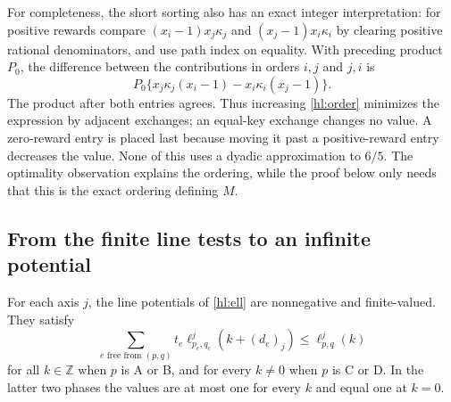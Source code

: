 For completeness, the short sorting also has an exact integer
interpretation: for positive rewards compare
$(x_i-1)x_j\kappa_j$ and $(x_j-1)x_i\kappa_i$ by clearing
positive rational denominators, and use path index on equality.
With preceding product $P_0$, the difference between the
contributions in orders $i,j$ and $j,i$ is
\begin{equation}\label{hl:exchange}
 P_0\{x_j\kappa_j(x_i-1)-x_i\kappa_i(x_j-1)\}.
\end{equation}
The product after both entries agrees.  Thus increasing
\eqref{hl:order} minimizes the expression by adjacent exchanges;
an equal-key exchange changes no value.  A zero-reward entry is
placed last because moving it past a positive-reward entry decreases
the value.  None of this uses a dyadic approximation to $6/5$.
The optimality observation explains the ordering, while the proof
below only needs that this is the exact ordering defining $M$.

\subsection{From the finite line tests to an infinite potential}

\begin{lemma}\label{hl:taillemma}
For each axis $j$, the line potentials of \eqref{hl:ell} are
nonnegative and finite-valued.  They satisfy
\begin{equation}\label{hl:lineexact}
 \sum_{e\text{ free from }(p,q)}t_e
             \ell^j_{p_e,q_e}(k+(d_e)_j)\le\ell^j_{p,q}(k)
\end{equation}
for all $k\in\mathbb Z$ when $p$ is A or B, and for every
$k\ne0$ when $p$ is C or D.  In the latter two phases the values
are at most one for every $k$ and equal one at $k=0$.
\end{lemma}

